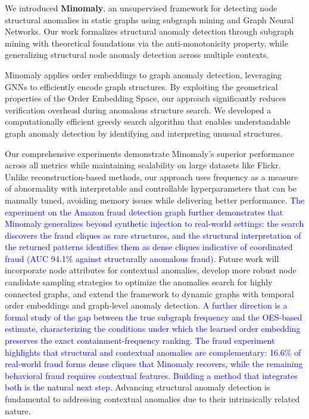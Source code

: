 \documentclass[preprint,12pt]{elsarticle}
\newcommand{\new}[1]{\textcolor{blue}{#1}}
\theoremstyle{plain}
\theoremstyle{definition}
\theoremstyle{remark}
\begin{document}
We introduced \textbf{Minomaly}, an unsupervised framework for detecting node structural anomalies in static graphs using subgraph mining and Graph Neural Networks. Our work formalizes structural anomaly detection through subgraph mining with theoretical foundations via the anti-monotonicity property, while generalizing structural node anomaly detection across multiple contexts.

Minomaly applies order embeddings to graph anomaly detection, leveraging GNNs to efficiently encode graph structures. By exploiting the geometrical properties of the Order Embedding Space, our approach significantly reduces verification overhead during anomalous structure search. We developed a computationally efficient greedy search algorithm that enables understandable graph anomaly detection by identifying and interpreting unusual structures.

Our comprehensive experiments demonstrate Minomaly's superior performance across all metrics while maintaining scalability on large datasets like Flickr. Unlike reconstruction-based methods, our approach uses frequency as a measure of abnormality with interpretable and controllable hyperparameters that can be manually tuned, avoiding memory issues while delivering better performance. \new{The experiment on the Amazon fraud detection graph further demonstrates that Minomaly generalizes beyond synthetic injection to real-world settings: the search discovers the fraud cliques as rare structures, and the structural interpretation of the returned patterns identifies them as dense cliques indicative of coordinated fraud (AUC 94.1\% against structurally anomalous fraud).} Future work will incorporate node attributes for contextual anomalies, develop more robust node candidate sampling strategies to optimize the anomalies search for highly connected graphs, and extend the framework to dynamic graphs with temporal order embeddings and graph-level anomaly detection. \new{A further direction is a formal study of the gap between the true subgraph frequency and the OES-based estimate, characterizing the conditions under which the learned order embedding preserves the exact containment-frequency ranking.} \new{The fraud experiment highlights that structural and contextual anomalies are complementary: 16.6\% of real-world fraud forms dense cliques that Minomaly recovers, while the remaining behavioral fraud requires contextual features. Building a method that integrates both is the natural next step.} Advancing structural anomaly detection is fundamental to addressing contextual anomalies due to their intrinsically related nature.




\end{document}
